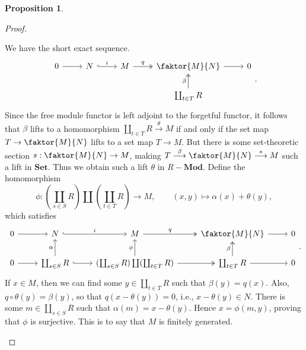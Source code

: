 \documentclass[10pt,letterpaper,cm]{nupset}
\theoremstyle{definition}
\theoremstyle{theorem}
\newtheorem{prop}[definition]{Proposition}
\theoremstyle{remark}
\newcommand{\1}{\mathbf{1}}
\newcommand{\0}{\vec 0}
\begin{document}
\begin{prop}
\begin{enumerate}
\begin{proof}
\begin{enumerate}
We have the short exact sequence.
\[\begin{tikzcd}
0 \arrow[r] & N \arrow[r, "i", hook] & M \arrow[r, "q", two heads] & \faktor{M}{N} \arrow[r] & 0 \\
 &  &  & \coprod_{t\in T}R \arrow[u, "\beta", two heads] & 
\end{tikzcd}
.\]
Since the free module functor is left adjoint to the forgetful functor, it follows that $\beta$ lifts to a homomorphism $ \coprod_{t\in T}R \overset{\theta}{\longrightarrow} M$  if and only if the set map $T \to \faktor{M}{N}$ lifts to a set map $T \to M$. But there is some set-theoretic section $s: \faktor{M}{N} \to M$, making $T \overset{\beta}{\longrightarrow} \faktor{M}{N} \overset{s}{\longrightarrow} M$ such a lift in $\mathbf{Set}$. Thus we obtain such a lift $\theta$ in $R{-}\mathbf{Mod}$. Define the homomorphism $$\phi : (\coprod_{s\in S} R) \coprod (\coprod_{t\in T} R)\to M, \quad \quad (x,y) \mapsto \alpha(x) + \theta(y),$$ which satisfies
\[
\begin{tikzcd}
0 \arrow[r] & N \arrow[r, "i", hook] & M \arrow[r, "q", two heads] & \faktor{M}{N} \arrow[r] & 0 \\
0 \arrow[r] & \coprod_{s\in S}R \arrow[u, "\alpha"] \arrow[r, hook] & (\coprod_{s\in S} R) \coprod (\coprod_{t\in T} R) \arrow[u, "\phi"] \arrow[r, two heads] & \coprod_{t\in T}R \arrow[u, "\beta", two heads] \arrow[r] & 0
\end{tikzcd}.
\] 
If $x\in M$, then we can find some $y\in \coprod_{t\in T}R$ such that $\beta(y) = q(x)$. Also, $q\circ \theta(y) = \beta(y)$, so that $q(x- \theta(y) ) = 0$, i.e., $x-\theta(y) \in N$. There is some $m\in \coprod_{s\in S}R$ such that $\alpha(m) = x-\theta(y)$. Hence $x= \phi(m,y)$, proving that $\phi$ is surjective. This is to say that $M$ is finitely generated.
\end{enumerate}
\end{proof}
\end{enumerate}
\end{prop}
\end{document}
